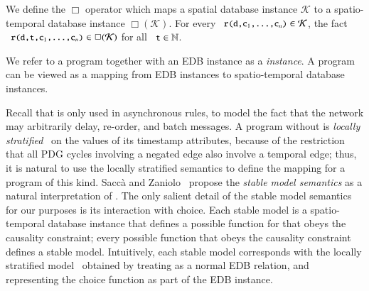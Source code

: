 We define the $\Box$ operator which maps a spatial database instance $\mathcal{K}$ to a spatio-temporal database instance $\mathcal{\Box(\mathcal{K})}$.  For every \linebreak $\dedalus{r(d,c\sub{1},\ldots,c\sub{n})} \in \mathcal{K}$,  the fact $\dedalus{r(d,t,c\sub{1},\ldots,c\sub{n})} \in \mathcal{\Box(\mathcal{K})}$ for all $\dedalus{t} \in \mathbb{N}$.  

We refer to a \lang program together with an EDB instance as a {\em \lang instance}.  A \lang program can be viewed as a mapping from EDB instances to spatio-temporal database instances.

Recall that  is only used in asynchronous rules, to model the fact that the network may arbitrarily delay, re-order, and batch messages.  A \lang program without  is {\em locally stratified}~\cite{local-strat} on the values of its timestamp attributes, because of the restriction that all PDG cycles involving a negated edge also involve a temporal edge; thus, it is natural to use the locally stratified semantics to define the mapping for a \lang program of this kind.  Sacc\`{a} and Zaniolo~\cite{sacca-zaniolo} propose the {\em stable model semantics} as a natural interpretation of .  The only salient detail of the stable model semantics for our purposes is its interaction with choice.  Each stable model is a spatio-temporal database instance that defines a possible function for  that obeys the causality constraint; every possible function that obeys the causality constraint defines a stable model.  Intuitively, each stable model corresponds with the locally stratified model~\cite{stable-model} obtained by treating  as a normal EDB relation, and representing the choice function as part of the EDB instance.

